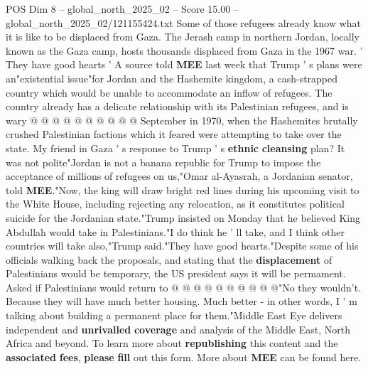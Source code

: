 \begin{textsample}{POS Dim 8 – global\_north\_2025\_02 – Score 15.00 – global\_north\_2025\_02/121155424.txt}
Some of those refugees already know what it is like to be displaced from Gaza.
The Jerash camp in northern Jordan, locally known as the Gaza camp, hosts thousands displaced from Gaza in the 1967 war. ' They have good hearts ' A source told \textbf{MEE} last week that Trump ' s plans were an"existential issue"for Jordan and the Hashemite kingdom, a cash-strapped country which would be unable to accommodate an inflow of refugees.
The country already has a delicate relationship with its Palestinian refugees, and is wary @ @ @ @ @ @ @ @ @ @ September in 1970, when the Hashemites brutally crushed Palestinian factions which it feared were attempting to take over the state.
My friend in Gaza ' s response to Trump ' s \textbf{ethnic} \textbf{cleansing} plan?
It was not polite"Jordan is not a banana republic for Trump to impose the acceptance of millions of refugees on us,"Omar al-Ayasrah, a Jordanian senator, told \textbf{MEE}."Now, the king will draw bright red lines during his upcoming visit to the White House, including rejecting any relocation, as it constitutes political suicide for the Jordanian state."Trump insisted on Monday that he believed King Abdullah would take in Palestinians."I do think he ' ll take, and I think other countries will take also,"Trump said."They have good hearts."Despite some of his officials walking back the proposals, and stating that the \textbf{displacement} of Palestinians would be temporary, the US president says it will be permament.
Asked if Palestinians would return to @ @ @ @ @ @ @ @ @ @"No they wouldn't.
Because they will have much better housing.
Much better - in other words, I ' m talking about building a permanent place for them."Middle East Eye delivers independent and \textbf{unrivalled} \textbf{coverage} and analysis of the Middle East, North Africa and beyond.
To learn more about \textbf{republishing} this content and the \textbf{associated} \textbf{fees}, \textbf{please} \textbf{fill} out this form.
More about \textbf{MEE} can be found here.

\end{textsample}
